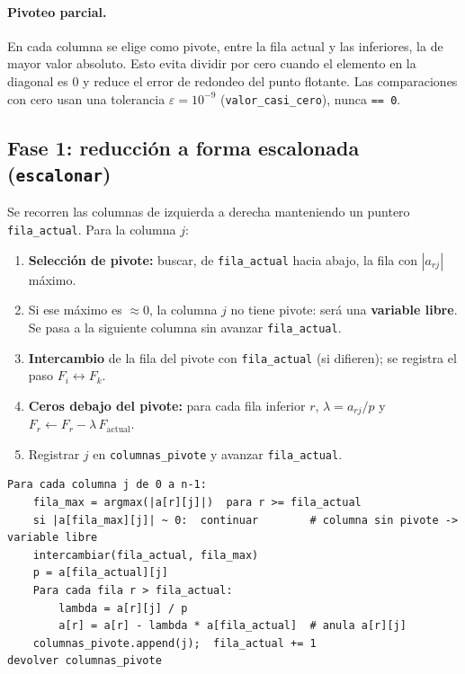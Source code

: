 \documentclass[11pt,a4paper]{article}
\begin{document}
\paragraph{Pivoteo parcial.} En cada columna se elige como pivote, entre la fila
actual y las inferiores, la de mayor valor absoluto. Esto evita dividir por cero
cuando el elemento en la diagonal es $0$ y reduce el error de redondeo del punto
flotante. Las comparaciones con cero usan una tolerancia $\varepsilon = 10^{-9}$
(\texttt{valor\_casi\_cero}), nunca \texttt{== 0}.

\subsection{Fase 1: reducci\'on a forma escalonada (\texttt{escalonar})}

Se recorren las columnas de izquierda a derecha manteniendo un puntero
\texttt{fila\_actual}. Para la columna $j$:

\begin{enumerate}[nosep]
  \item \textbf{Selecci\'on de pivote:} buscar, de \texttt{fila\_actual} hacia
        abajo, la fila con $|a_{rj}|$ m\'aximo.
  \item Si ese m\'aximo es $\approx 0$, la columna $j$ no tiene pivote: ser\'a una
        \textbf{variable libre}. Se pasa a la siguiente columna sin avanzar
        \texttt{fila\_actual}.
  \item \textbf{Intercambio} de la fila del pivote con \texttt{fila\_actual} (si
        difieren); se registra el paso $F_i \leftrightarrow F_k$.
  \item \textbf{Ceros debajo del pivote:} para cada fila inferior $r$,
        $\lambda = a_{rj}/p$ y $F_r \leftarrow F_r - \lambda\,F_{\text{actual}}$.
  \item Registrar $j$ en \texttt{columnas\_pivote} y avanzar \texttt{fila\_actual}.
\end{enumerate}

\begin{lstlisting}
Para cada columna j de 0 a n-1:
    fila_max = argmax(|a[r][j]|)  para r >= fila_actual
    si |a[fila_max][j]| ~ 0:  continuar        # columna sin pivote -> variable libre
    intercambiar(fila_actual, fila_max)
    p = a[fila_actual][j]
    Para cada fila r > fila_actual:
        lambda = a[r][j] / p
        a[r] = a[r] - lambda * a[fila_actual]  # anula a[r][j]
    columnas_pivote.append(j);  fila_actual += 1
devolver columnas_pivote
\end{lstlisting}
\end{document}
